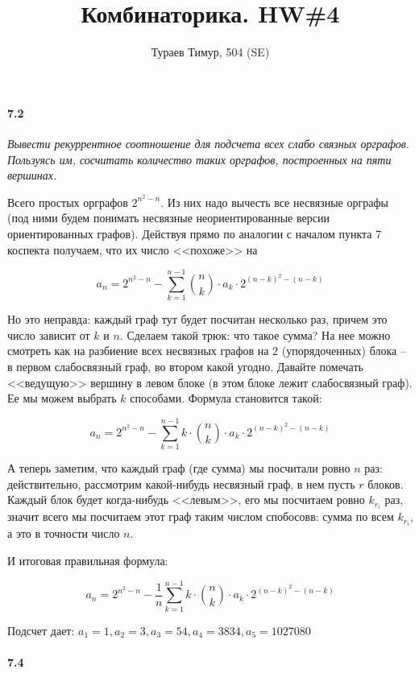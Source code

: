 \documentclass[russian]{article}
\begin{document}
\title{Комбинаторика. HW\#4}
\author{Тураев Тимур, 504 (SE)}
\maketitle

\paragraph*{7.2}

\textit{Вывести рекуррентное соотношение для подсчета всех слабо связных орграфов. Пользуясь им, сосчитать количество таких орграфов, построенных на пяти вершинах.}

Всего простых орграфов $2^{n^2 - n}$. Из них надо вычесть все несвязные орграфы (под ними будем понимать несвязные неориентированные версии ориентированных графов). Действуя прямо по аналогии с началом пункта 7 коспекта получаем, что их число <<похоже>> на 

\[
a_n = 2^{n^2 - n} - \sum_{k=1}^{n-1} \binom{n}{k} \cdot a_k \cdot 2^{(n-k)^2 - (n-k)}
\]

Но это неправда: каждый граф тут будет посчитан несколько раз, причем это число зависит от $k$ и $n$. Сделаем такой трюк: что такое сумма? На нее можно смотреть как на разбиение всех несвязных графов на 2 (упорядоченных) блока -- в первом слабосвязный граф, во втором какой угодно. Давайте помечать <<ведущую>> вершину в левом блоке (в этом блоке лежит слабосвязный граф). Ее мы можем выбрать $k$ способами. Формула становится такой:

\[
a_n = 2^{n^2 - n} - \sum_{k=1}^{n-1} k \cdot \binom{n}{k} \cdot a_k \cdot 2^{(n-k)^2 - (n-k)}
\]

А теперь заметим, что каждый граф (где сумма) мы посчитали ровно $n$ раз: действительно, рассмотрим какой-нибудь несвязный граф, в нем пусть $r$ блоков. Каждый блок будет когда-нибудь <<левым>>, его мы посчитаем ровно $k_{r_i}$ раз, значит всего мы посчитаем этот граф таким числом спобосовв: сумма по всем $k_{r_i}$, а это в точности число $n$. 

И итоговая правильная формула:

\[
a_n = 2^{n^2 - n} - \frac{1}{n} \sum_{k=1}^{n-1} k \cdot \binom{n}{k} \cdot a_k \cdot 2^{(n-k)^2 - (n-k)}
\]

Подсчет дает: $a_1 = 1, a_2 = 3, a_3 = 54, a_4 = 3834, a_5 = 1027080$

\paragraph*{7.4}
\end{document}
